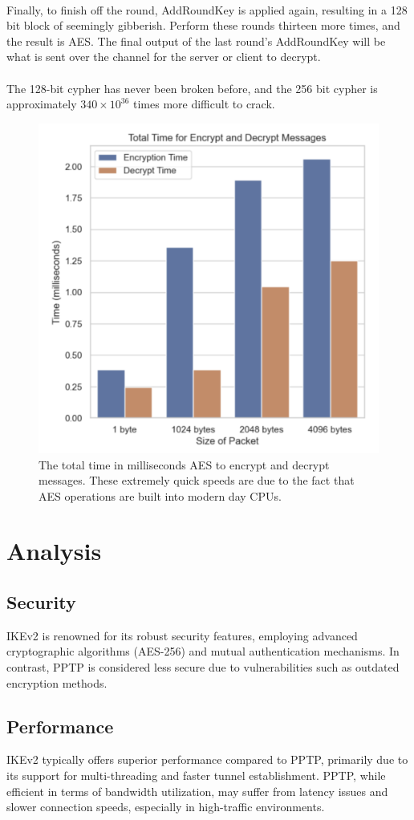 \documentclass[runningheads]{llncs}
\begin{document}
\\
Finally, to finish off the round, AddRoundKey is applied again, resulting in a 128 bit block of seemingly gibberish. Perform these rounds thirteen more times, and the result is AES. The final output of the last round’s AddRoundKey will be what is sent over the channel for the server or client to decrypt.\\
\\
The 128-bit cypher has never been broken before, and the 256 bit cypher is approximately $340 \times 10^{36}$ times more difficult to crack. \cite{aes_study}
\begin{figure}[h]
    \centering
    \includegraphics[width=0.7\linewidth]{aes_1.png}
    \caption{The total time in milliseconds AES to encrypt and decrypt messages. These extremely quick speeds are due to the fact that AES operations are built into modern day CPUs.}
    \label{fig:Time for Encryption and Decryption using AES}
\end{figure}

\section{Analysis}
\subsection{Security}
IKEv2 is renowned for its robust security features, employing advanced cryptographic algorithms (AES-256) and mutual authentication mechanisms. In contrast, PPTP is considered less secure due to vulnerabilities such as outdated encryption methods.
\subsection{Performance}
IKEv2 typically offers superior performance compared to PPTP, primarily due to its support for multi-threading and faster tunnel establishment. PPTP, while efficient in terms of bandwidth utilization, may suffer from latency issues and slower connection speeds, especially in high-traffic environments.
\end{document}

